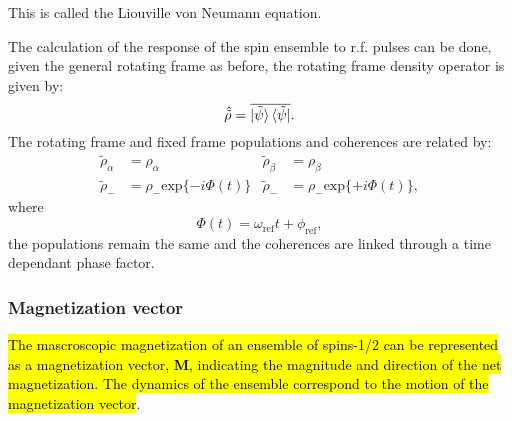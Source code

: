 This is called the Liouville von Neumann equation.

The calculation of the response of the spin ensemble to r.f. pulses can be done, given the
general rotating frame as before, the rotating frame density operator is given by:
\begin{equation}
  \hat{\tilde{\rho}} = \overline{\ket{\tilde{\psi}}\bra{\tilde{\psi}}}.
\end{equation}
The rotating frame and fixed frame populations and coherences are related by:
\begin{align}\label{eqn:DensityRotFrame}
  \tilde{\rho}_\alpha &= \rho_\alpha & \tilde{\rho}_\beta &= \rho_\beta\\
  \tilde{\rho}_- &= \rho_-\text{exp}\{-i\Phi(t)\} & \tilde{\rho}_- &= \rho_-\text{exp}\{+i\Phi(t)\},
\end{align}
where
\begin{equation}
  \Phi(t) = \omega_{\text{ref}}t + \phi_{\text{ref}},
\end{equation}
the populations remain the same and the coherences are linked through a time dependant phase factor.

\subsubsection{Magnetization vector}

\hl{The mascroscopic magnetization of an ensemble of spins-1/2 can be represented as a magnetization vector, $\mathbf{M}$, indicating the magnitude
and direction of the net magnetization. The dynamics of the ensemble correspond to the motion of the magnetization vector}.

